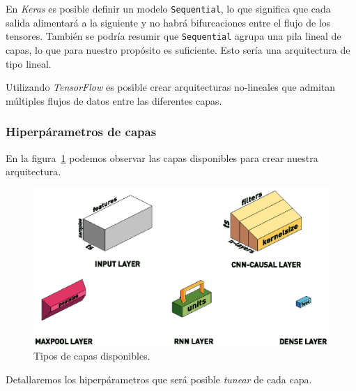 \documentclass[a4paper,12pt]{article}
\begin{document}
En \textit{Keras} es posible definir un modelo \texttt{Sequential}, lo que significa que cada salida alimentará a la siguiente y no habrá bifurcaciones entre el flujo de los tensores. También se podría resumir que \texttt{Sequential} agrupa una pila lineal de capas, lo que para nuestro propósito es suficiente. Esto sería una arquitectura de tipo lineal.

Utilizando \textit{TensorFlow} es posible crear arquitecturas no-lineales que admitan múltiples flujos de datos entre las diferentes capas.

\subsubsection{Hiperpárametros de capas}
En la figura~\ref{fig:layer_types} podemos observar las capas disponibles para crear nuestra arquitectura.

\begin{figure}[H]
	\begin{center}
	\includegraphics{model_types.eps}
  	\caption{Tipos de capas disponibles.}
  	\label{fig:layer_types}
  	\end{center}
\end{figure}

Detallaremos los hiperpárametros que será posible \textit{tunear} de cada capa.
\end{document}
